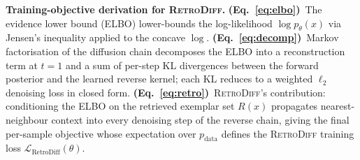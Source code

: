 \caption{\textbf{Training-objective derivation for \textsc{RetroDiff}.}
\textbf{(Eq.~\ref{eq:elbo})}~The evidence lower bound (ELBO) lower-bounds the
log-likelihood $\log p_\theta(x)$ via Jensen's inequality applied to the concave $\log$.
\textbf{(Eq.~\ref{eq:decomp})}~Markov factorisation of the diffusion chain decomposes the
ELBO into a reconstruction term at $t\!=\!1$ and a sum of per-step KL divergences between
the forward posterior and the learned reverse kernel; each KL reduces to a weighted
$\ell_2$ denoising loss in closed form.
\textbf{(Eq.~\ref{eq:retro})}~\textsc{RetroDiff}'s contribution: conditioning the ELBO on
the retrieved exemplar set $R(x)$ propagates nearest-neighbour context into every
denoising step of the reverse chain, giving the final per-sample objective whose
expectation over $p_{\mathrm{data}}$ defines the \textsc{RetroDiff} training loss
$\mathcal{L}_{\mathrm{RetroDiff}}(\theta)$.}
